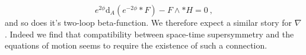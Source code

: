 \documentclass[12pt,a4paper]{article}
\def\d{\textrm{d}}
\theoremstyle{definition}
\begin{document}
\begin{equation*}
e^{2\phi}\d_A(e^{-2\phi}*F)-F\wedge*H=0\:,
\end{equation*}
and so does it's two-loop beta-function. We therefore expect a similar story for $\nabla$. Indeed we find that compatibility between space-time supersymmetry and the equations of motion seems to require the existence of such a connection.

\newpage





\end{document}
